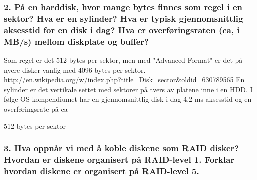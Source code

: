 \documentclass[11pt]{article}
\begin{document}


\subsubsection{2. På en harddisk, hvor mange bytes finnes som regel i en sektor? Hva er en sylinder? Hva er typisk gjennomsnittlig aksesstid for en disk i dag? Hva er overføringsraten (ca, i MB/s) mellom diskplate og buffer?}

Som regel er det 512 bytes per sektor, men med "Advanced Format" er det på nyere disker vanlig med 4096 bytes per sektor. \url{http://en.wikipedia.org/w/index.php?title=Disk_sector&oldid=630789565}
En sylinder er det vertikale settet med sektorer på tvers av platene inne i en HDD.
I følge OS kompendiumet har en gjennomsnittlig disk i dag 4.2 ms aksesstid og en overføringsrate på ca 

512 bytes per sektor

\subsubsection{3. Hva oppnår vi med å koble diskene som RAID disker? Hvordan er diskene organisert på RAID-level 1. Forklar hvordan diskene er organisert på RAID-level 5.}
\end{document}
